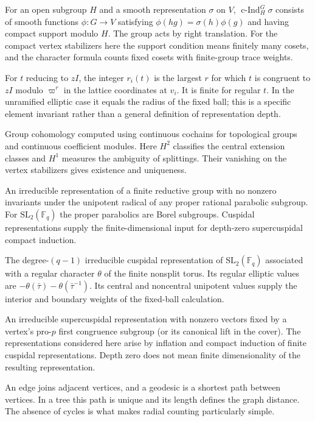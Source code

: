 \documentclass[12pt, letterpaper]{article}
\numberwithin{equation}{section}
\theoremstyle{definition}
\theoremstyle{remark}
\newcommand{\kk}{\mathbb{F}_q}
\newcommand{\Gbar}{\mathrm{SL}_2(\kk)}
\newcommand{\cInd}{\operatorname{c-Ind}}
\begin{document}
\begin{description}[style=nextline,leftmargin=1.5em,itemsep=5pt]
 \item[Compact induction] For an open subgroup $H$ and a smooth representation $\sigma$ on $V$, $\cInd_H^G\sigma$ consists of smooth functions $\phi:G\to V$ satisfying $\phi(hg)=\sigma(h)\phi(g)$ and having compact support modulo $H$. The group acts by right translation. For the compact vertex stabilizers here the support condition means finitely many cosets, and the character formula counts fixed cosets with finite-group trace weights.
 \item[Congruence depth] For $t$ reducing to $zI$, the integer $r_i(t)$ is the largest $r$ for which $t$ is congruent to $zI$ modulo $\varpi^r$ in the lattice coordinates at $v_i$. It is finite for regular $t$. In the unramified elliptic case it equals the radius of the fixed ball; this is a specific element invariant rather than a general definition of representation depth.
 \item[Continuous group cohomology] Group cohomology computed using continuous cochains for topological groups and continuous coefficient modules. Here $H^2$ classifies the central extension classes and $H^1$ measures the ambiguity of splittings. Their vanishing on the vertex stabilizers gives existence and uniqueness.
 \item[Cuspidal representation (finite group)] An irreducible representation of a finite reductive group with no nonzero invariants under the unipotent radical of any proper rational parabolic subgroup. For $\Gbar$ the proper parabolics are Borel subgroups. Cuspidal representations supply the finite-dimensional input for depth-zero supercuspidal compact induction.
 \item[Deligne--Lusztig cuspidal representation ($sigma_	heta$)] The degree-$(q-1)$ irreducible cuspidal representation of $\Gbar$ associated with a regular character $\theta$ of the finite nonsplit torus. Its regular elliptic values are $-\theta(\bar\tau)-\theta(\bar\tau^{-1})$. Its central and noncentral unipotent values supply the interior and boundary weights of the fixed-ball calculation.
 \item[Depth-zero supercuspidal representation] An irreducible supercuspidal representation with nonzero vectors fixed by a vertex's pro-$p$ first congruence subgroup (or its canonical lift in the cover). The representations considered here arise by inflation and compact induction of finite cuspidal representations. Depth zero does not mean finite dimensionality of the resulting representation.
 \item[Edge and geodesic] An edge joins adjacent vertices, and a geodesic is a shortest path between vertices. In a tree this path is unique and its length defines the graph distance. The absence of cycles is what makes radial counting particularly simple.

\end{description}
\end{document}
